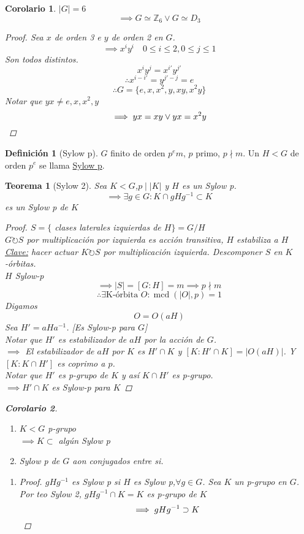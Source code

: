 \documentclass[11pt]{book}
\newcommand{\set}[1]{\mathbb{#1}}
\DeclareMathOperator{\mcd}{mcd}
\newtheorem{thm}{Teorema}[section]
\newtheorem*{cor}{Corolario}
\theoremstyle{definition}
\newtheorem{defn}{Definición}[section]
\begin{document}
\begin{cor}
	$|G|=6$
	\[\implies G\simeq\set{Z}_6\vee G\simeq D_3\]
	\begin{proof}
		Sea $x$ de orden 3 e $y$ de orden 2 en $G$.
		\[\implies x^iy^i\quad 0\leq i\leq 2, 0\leq j\leq 1\]
		Son todos distintos.
		\[x^iy^j=x^{i'}y^{j'}\]
		\[\therefore x^{i-i'}=y^{j'-j}=e\]
		\[\therefore G=\{e,x,x^2,y,xy,x^2y\}\]
		Notar que $yx\neq e,x,x^2,y$
		\[\implies yx=xy\vee yx=x^2y\qedhere\]
	\end{proof}
\end{cor}
\begin{defn}[Sylow p]
	$G$ finito de orden $p^em$, $p$ primo, $p\nmid m$. Un $H< G$ de orden $p^e$ se llama \underline{Sylow p}.
\end{defn}
\begin{thm}[Sylow 2]
	Sea $K<G$,$p\mid|K|$ y $H$ es un Sylow p.
	\[\implies\exists g\in G: K\cap gHg^{-1}\subset K\]
	es un Sylow p de $K$
	\begin{proof}
		$S=\{$ clases laterales izquierdas de $H\}=G/H$\\
		$G\circlearrowright S$ por multiplicación por izquierda es acción transitiva, $H$ estabiliza a $H$\\
		\underline{Clave:} hacer actuar $K\circlearrowright S$ por multiplicación izquierda. Descomponer $S$ en $K$-órbitas.\\
		$H$ Sylow-p
		\[\implies |S|=[G:H]=m\implies p\nmid m\]
		\[\therefore \exists \textrm{K-órbita }O:\mcd(|O|,p)=1\]
		Digamos
		\[O=O(aH)\]
		Sea $H'=aHa^{-1}$. [Es Sylow-p para $G$]\\
		Notar que $H'$ es estabilizador de $aH$ por la acción de $G$.\\
		$\implies$ El estabilizador de $aH$ por $K$ es $H'\cap K$ y $[K:H'\cap K]=|O(aH)|$. Y $[K:K\cap H']$ es coprimo a $p$.\\
		Notar que $H'$ es p-grupo de $K$ y así $K\cap H'$ es p-grupo.\\
		$\implies H'\cap K$ es Sylow-p para $K$
	\end{proof}
	\begin{cor}
		\
		\begin{enumerate}[label=(\alph*)]
			\item $K<G$ p-grupo\\
			$\implies K\subset$ algún Sylow p
			
			\item Sylow p de $G$ aon conjugados entre si.
		\end{enumerate}
		\begin{enumerate}[label=(\alph*)]
			\item \begin{proof}
				$gHg^{-1}$ es Sylow p si $H$ es Sylow p,$\forall g\in G$. Sea $K$ un p-grupo en $G$.\\
				Por teo Sylow 2, $gHg^{-1}\cap K=K$ es p-grupo de $K$
				\[\implies gHg^{-1}\supset K\qedhere\]
			\end{proof}


\end{enumerate}
\end{cor}
\end{thm}
\end{document}
